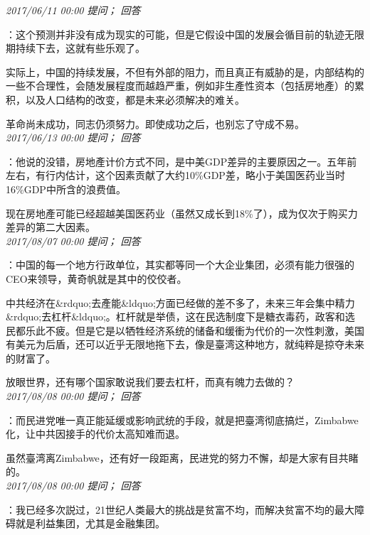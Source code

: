 \documentclass[twocolumn]{ctexart}
\begin{document}
\textit{\hfill\noindent\small 2017/06/11 00:00 提问； 回答}

：这个预测并非没有成为现实的可能，但是它假设中国的发展会循目前的轨迹无限期持续下去，这就有些乐观了。

实际上，中国的持续发展，不但有外部的阻力，而且真正有威胁的是，内部结构的一些不合理性，会随发展程度而越趋严重，例如非生產性资本（包括房地產）的累积，以及人口结构的改变，都是未来必须解决的难关。

革命尚未成功，同志仍须努力。即使成功之后，也别忘了守成不易。\\

\textit{\hfill\noindent\small 2017/06/13 00:00 提问； 回答}

：他说的没错，房地產计价方式不同，是中美GDP差异的主要原因之一。五年前左右，有行内估计，这个因素贡献了大约10\%GDP差，略小于美国医药业当时16\%GDP中所含的浪费值。

现在房地產可能已经超越美国医药业（虽然又成长到18\%了），成为仅次于购买力差异的第二大因素。\\

\textit{\hfill\noindent\small 2017/08/07 00:00 提问； 回答}

：中国的每一个地方行政单位，其实都等同一个大企业集团，必须有能力很强的CEO来领导，黄奇帆就是其中的佼佼者。

中共经济在\&rdquo;去產能\&ldquo;方面已经做的差不多了，未来三年会集中精力\&rdquo;去杠杆\&ldquo;。杠杆就是举债，这在民选制度下是糖衣毒药，政客和选民都乐此不疲。但是它是以牺牲经济系统的储备和缓衝为代价的一次性刺激，美国有美元为后盾，还可以近乎无限地拖下去，像是臺湾这种地方，就纯粹是掠夺未来的财富了。

放眼世界，还有哪个国家敢说我们要去杠杆，而真有魄力去做的？\\

\textit{\hfill\noindent\small 2017/08/08 00:00 提问； 回答}

：而民进党唯一真正能延缓或影响武统的手段，就是把臺湾彻底搞烂，Zimbabwe化，让中共因接手的代价太高知难而退。

虽然臺湾离Zimbabwe，还有好一段距离，民进党的努力不懈，却是大家有目共睹的。\\

\textit{\hfill\noindent\small 2017/08/08 00:00 提问； 回答}

：我已经多次説过，21世纪人类最大的挑战是贫富不均，而解决贫富不均的最大障碍就是利益集团，尤其是金融集团。\\
\end{document}

